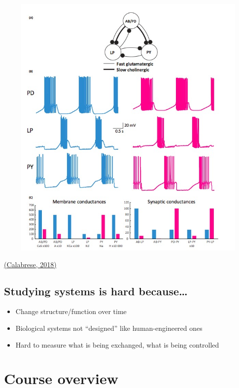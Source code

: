\documentclass[]{article}
\providecommand{\tightlist}{%
  \setlength{\itemsep}{0pt}\setlength{\parskip}{0pt}}
\begin{document}
\begin{center}\includegraphics[width=8.64in,height=500px]{img/calabrese-2018} \end{center}

\href{http://doi.org/10.1016/j.tins.2018.05.006}{(Calabrese, 2018)}

\hypertarget{studying-systems-is-hard-because-1}{%
\subsection{Studying systems is hard
because\ldots{}}\label{studying-systems-is-hard-because-1}}

\begin{itemize}
\tightlist
\item
  Change structure/function over time
\item
  Biological systems not ``designed'' like human-engineered ones
\item
  Hard to measure what is being exchanged, what is being controlled
\end{itemize}

\hypertarget{course-overview}{%
\section{Course overview}\label{course-overview}}
\end{document}
